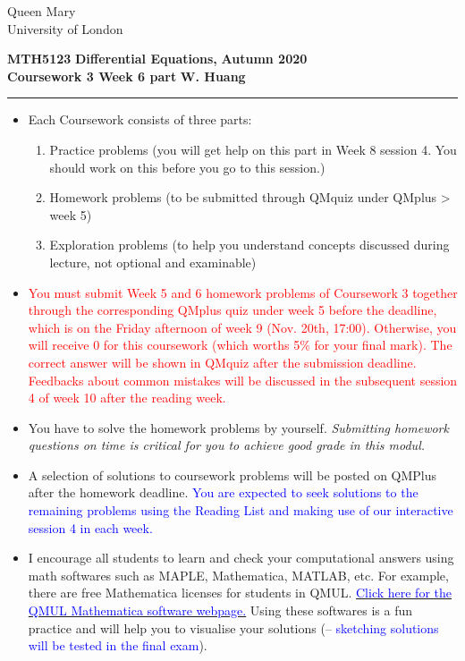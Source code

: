 \documentclass[11pt,a4paper,twoside]{article}
\begin{document}
	\begin{singlespace}
		\begin{center}
			\Huge Queen Mary\\
			\LARGE University of London
		\end{center}
		\Large \textbf{MTH5123} \hfill \Large \textbf{Differential Equations,} \hfill \Large \textbf{Autumn 2020}\\
		\large \textbf{Coursework 3 Week 6 part} \hfill \large \textbf{W. Huang}
		\rule{\textwidth}{0.4pt}
	\end{singlespace}
	\begin{itemize}
		\item Each Coursework consists of three parts:
		\begin{enumerate}[\bfseries I.]
			\item Practice problems (you will get help on this part in Week 8 session 4. You should work on this before you go to this session.)
			\item Homework problems (to be submitted through QMquiz under QMplus > week 5)
			\item Exploration problems (to help you understand concepts discussed during lecture, not optional and examinable)
		\end{enumerate}
		\item \textcolor{red}{You must submit Week 5 and 6 homework problems of Coursework 3 together through the corresponding QMplus quiz under week 5 before the deadline, which is on the Friday afternoon of week 9 (Nov. 20th, 17:00). Otherwise, you will receive 0 for this coursework (which worths 5\% for your final mark). The correct answer will be shown in QMquiz after the submission deadline. Feedbacks about common mistakes will be discussed in the subsequent session 4 of week 10 after the reading week.
		}
		\item You have to solve the homework problems by yourself. \textit{Submitting homework questions on time is critical for you to achieve good grade in this modul.}
		\item A selection of solutions to coursework problems will be posted on QMPlus after the homework deadline. \textcolor{blue}{You are expected to seek solutions to the remaining problems using the Reading List and making use of our interactive session 4 in each week.}
		\item I encourage all students to learn and check your computational answers using math softwares such as MAPLE, Mathematica, MATLAB, etc. For example, there are free Mathematica licenses for students in QMUL. \href{https://www.its.qmul.ac.uk/services/service-catalogue/items/software---computational-mathematica.html}{\textcolor{blue}{Click here for the QMUL Mathematica software webpage.}} Using these softwares is a fun practice and will help you to visualise your solutions (– \textcolor{blue}{sketching solutions will be tested in the final exam}).
	\end{itemize}
\end{document}
